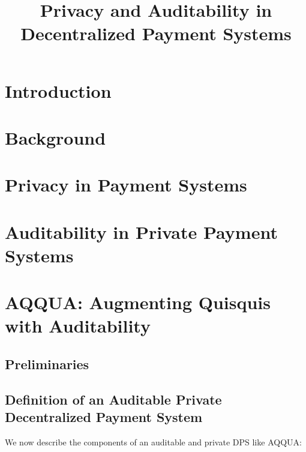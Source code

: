 \documentclass[11pt, twoside, a4paper]{report}
\title{Privacy and Auditability in Decentralized Payment Systems}
\begin{document}
    
    \sle
    
    
    

    \tableofcontents
    
    

    \chapter{Introduction}
        

    \chapter{Background}
        
        
    
    \chapter{Privacy in Payment Systems}
        
        

    \chapter{Auditability in Private Payment Systems}
    
    

    \chapter{AQQUA: Augmenting Quisquis with Auditability}
        
        \section{Preliminaries}
        
        
        \section{Definition of an Auditable Private Decentralized Payment System}
        We now describe the components of an auditable and private DPS like AQQUA:

        
        
        
        
        
        
\end{document}
